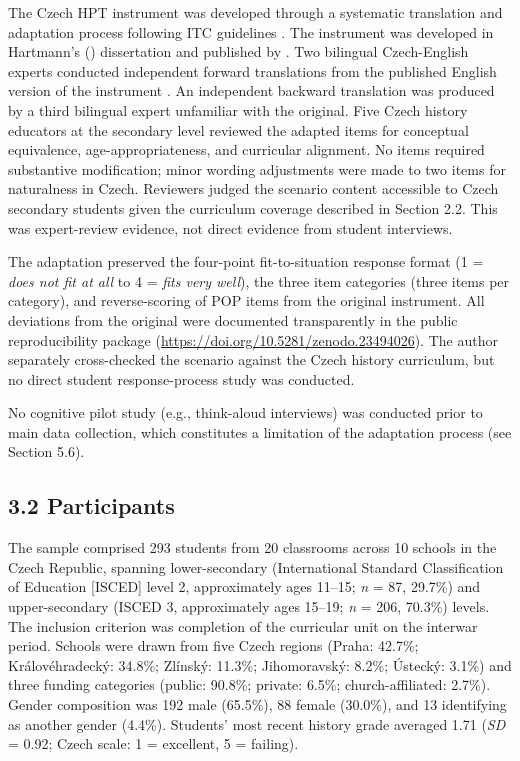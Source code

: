 \documentclass[PCJ,Unicode,screen,mode=plain]{cedram}
\begin{document}
The Czech HPT instrument was developed through a systematic translation and adaptation process following ITC guidelines \citep{ITC2017}. The instrument was developed in Hartmann's (\citeyear{Hartmann2008}) dissertation and published by \citet{Hartmann_Hasselhorn2008Historical}. Two bilingual Czech-English experts conducted independent forward translations from the published English version of the instrument \citep{Hartmann_Hasselhorn2008Historical}. An independent backward translation was produced by a third bilingual expert unfamiliar with the original. Five Czech history educators at the secondary level reviewed the adapted items for conceptual equivalence, age-appropriateness, and curricular alignment. No items required substantive modification; minor wording adjustments were made to two items for naturalness in Czech. Reviewers judged the scenario content accessible to Czech secondary students given the curriculum coverage described in Section 2.2. This was expert-review evidence, not direct evidence from student interviews.

The adaptation preserved the four-point fit-to-situation response format
(1 = \emph{does not fit at all} to 4 = \emph{fits very well}), the three item
categories (three items per category), and reverse-scoring of POP items from
the original instrument. All deviations from the original were documented
transparently in the public reproducibility package
(\url{https://doi.org/10.5281/zenodo.23494026}).
The author separately cross-checked the scenario against the Czech history
curriculum, but no direct student response-process study was conducted.

No cognitive pilot study (e.g., think-aloud interviews) was conducted prior to main data collection, which constitutes a limitation of the adaptation process (see Section 5.6).

\subsection*{3.2 Participants}\label{participants}

The sample comprised 293 students from 20 classrooms across 10
schools in the Czech Republic, spanning lower-secondary
(International Standard Classification of Education [ISCED] level 2,
approximately ages 11--15; \emph{n} = 87, 29.7\%) and upper-secondary
(ISCED 3, approximately ages 15--19; \emph{n} = 206, 70.3\%) levels. The inclusion criterion was completion of the curricular unit on the interwar period. Schools were drawn from five Czech regions (Praha: 42.7\%; Královéhradecký: 34.8\%; Zlínský: 11.3\%; Jihomoravský: 8.2\%; Ústecký: 3.1\%) and three funding categories (public: 90.8\%; private: 6.5\%; church-affiliated: 2.7\%). Gender composition was 192 male (65.5\%), 88 female (30.0\%), and 13 identifying as another gender (4.4\%). Students' most recent history grade averaged 1.71 (\emph{SD} = 0.92; Czech scale: 1 = excellent, 5 = failing).
\end{document}

